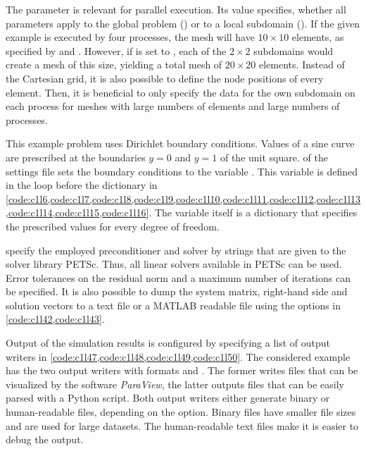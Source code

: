 The parameter  is relevant for parallel execution. Its value specifies, whether all parameters apply to the global problem () or to a local subdomain (). If the given example is executed by four processes, the mesh will have $10\times 10$ elements, as specified by  and . 
However, if  is set to , each of the $2\times 2$ subdomains would create a mesh of this size, yielding a total mesh of $20 \times 20$ elements. Instead of the Cartesian grid, it is also possible to define the node positions of every element. Then, it is beneficial to only specify the data for the own subdomain on each process for meshes with large numbers of elements and large numbers of processes.

This example problem uses Dirichlet boundary conditions. Values of a sine curve are prescribed at the boundaries $y=0$ and $y=1$ of the unit square.  of the settings file sets the boundary conditions to the variable . This variable is defined in the loop before the  dictionary in \cref{code:c1l6,code:c1l7,code:c1l8,code:c1l9,code:c1l10,code:c1l11,code:c1l12,code:c1l13,code:c1l14,code:c1l15,code:c1l16}. The  variable itself is a dictionary that specifies the prescribed values for every degree of freedom. 

 specify the employed preconditioner and solver by strings that are given to the solver library PETSc. Thus, all linear solvers available in PETSc can be used.
Error tolerances on the residual norm and a maximum number of iterations can be specified. It is also possible to dump the system matrix, right-hand side and solution vectors to a text file or a MATLAB readable file using the options in \cref{code:c1l42,code:c1l43}.

Output of the simulation results is configured by specifying a list of output writers in \cref{code:c1l47,code:c1l48,code:c1l49,code:c1l50}. The considered example has the two output writers with formats  and . The former writes files that can be visualized by the software \emph{ParaView}, the latter outputs files that can be easily parsed with a Python script. Both output writers either generate binary or human-readable files, depending on the  option. Binary files have smaller file sizes and are used for large datasets. The human-readable text files make it is easier to debug the output.

